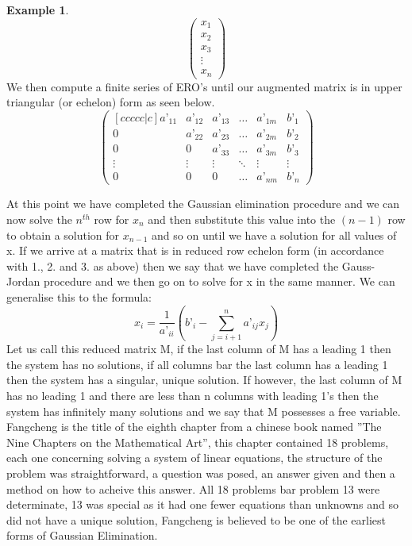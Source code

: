 \documentclass[12pt,reqno,twoside,titlepage]{article}
\theoremstyle{definition}
\newtheorem{exmp}{Example}[section]
\begin{document}
\begin{exmp}
\begin{equation*}
\begin{pmatrix}
x_{1} \\
x_{2} \\
x_{3} \\
\vdots \\
x_{n}
\end{pmatrix}
\end{equation*}
We then compute a finite series of ERO’s until our augmented matrix is in upper triangular (or echelon) form as seen below.
\begingroup
\renewcommand*{\arraystretch}{1.5}
\begin{equation*}
    \begin{pmatrix}[ccccc|c]
    a’_{11} & a’_{12} & a’_{13} & \dots & a’_{1m} & b’_{1} \\
    0 & a’_{22} & a’_{23} & \dots & a’_{2m} & b’_{2} \\
    0 & 0 & a’_{33} & \dots & a’_{3m} & b’_{3} \\
    \vdots & \vdots & \vdots & \ddots & \vdots & \vdots \\
    0 & 0 & 0 & \dots & a’_{nm} & b’_{n}
    \end{pmatrix}
\end{equation*}
\endgroup
\end{exmp}
At this point we have completed the Gaussian elimination procedure and we can now solve the $n^{th}$ row for $x_{n}$ and then substitute this value into the $(n-1)$ row to obtain a solution for $x_{n-1}$ and so on until we have a solution for all values of x.
\newline
If we arrive at a matrix that is in reduced row echelon form (in accordance with 1., 2. and 3. as above) then we say that we have completed the Gauss-Jordan procedure and we then go on to solve for x in the same manner. We can generalise this to the formula:
\begin{equation*}
    x_{i} = \frac{1}{a’_{ii}}(b’_{i} - \sum_{j = i + 1}^{n} a’_{ij} x_{j})
\end{equation*}
\newline
Let us call this reduced matrix M, if the last column of M has a leading 1 then the system has no solutions, if all columns bar the last column has a leading 1 then the system has a singular, unique solution. If however, the last column of M has no leading 1 and there are less than n columns with leading 1’s then the system has infinitely many solutions and we say that M possesses a free variable.
\newline
Fangcheng is the title of the eighth chapter from a chinese book named ”The Nine Chapters on the Mathematical Art”, this chapter contained 18 problems, each one concerning solving a system of linear equations, the structure of the problem was straightforward, a question was posed, an answer given and then a method on how to acheive this answer. All 18 problems bar problem 13 were determinate, 13 was special as it had one fewer equations than unknowns and so did not have a unique solution, Fangcheng is believed to be one of the earliest forms of Gaussian Elimination.
\end{document}
